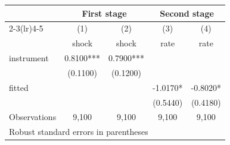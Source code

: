 \begin{tabular}{l*{4}{c}}
\toprule
       &\multicolumn{2}{c}{First stage}&\multicolumn{2}{c}{Second stage}\\
\cmidrule(lr){2-3}\cmidrule(lr){4-5}
       &\multicolumn{1}{c}{(1)}&\multicolumn{1}{c}{(2)}&\multicolumn{1}{c}{(3)}&\multicolumn{1}{c}{(4)}\\
       &\multicolumn{1}{c}{shock}&\multicolumn{1}{c}{shock}&\multicolumn{1}{c}{rate}&\multicolumn{1}{c}{rate}\\
\midrule
instrument & 0.8100*** & 0.7900*** &          &          \\
           & (0.1100)  & (0.1200)  &          &          \\
\addlinespace
fitted     &           &           & -1.0170* & -0.8020* \\
           &           &           & (0.5440) & (0.4180) \\
\midrule
Observations & 9,100 & 9,100 & 9,100 & 9,100 \\
\bottomrule
\multicolumn{5}{l}{\footnotesize Robust standard errors in parentheses}\\
\end{tabular}
